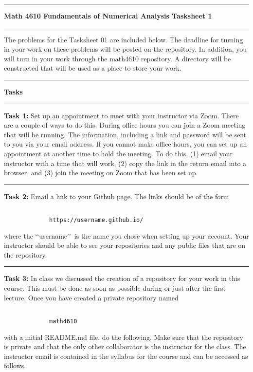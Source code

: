 \documentclass[10pt,fleqn]{article}
\begin{document}
\vskip0.1in\hrule\vskip0.1in \noindent
{\bf{\Large Math 4610 Fundamentals of Numerical Analysis Tasksheet 1 }}
\vskip0.1in\hrule\vskip0.1in \noindent
The problems for the Tasksheet 01 are included below. The deadline for turning
in your work on these problems will be posted on the repository. In addition,
you will turn in your work through the math4610 repository. A directory will be
constructed that will be used as a place to store your work.
\vskip0.1in\hrule\vskip0.1in \noindent
{\bf{\large Tasks}}
\vskip0.1in\hrule\vskip0.1in \noindent
\begin{trivlist}
  \item[\bf Task 1:] Set up an appointment to meet with your instructor via
        Zoom. There are a couple of ways to do this. During office hours you
        can join a Zoom meeting that will be running. The information, including
        a link and password will be sent to you via your email address. If you
        cannot make office hours, you can set up an appointment at another time
        to hold the meeting. To do this, (1) email your instructor with a time
        that will work, (2) copy the link in the return email into a browser,
        and (3) join the meeting on Zoom that has been set up.
\vskip0.1in\hrule\vskip0.1in \noindent
  \item[\bf Task 2:] Email a link to your Github page. The links should be of
        the form
        \begin{verbatim}

             https://username.github.io/

        \end{verbatim}
        where the \lq\lq username\rq\rq\ is the name you chose when setting up
        your account. Your instructor should be able to see your repositories 
        and any public files that are on the repository.
\vskip0.1in\hrule\vskip0.1in \noindent
  \item[\bf Task 3:] In class we discussed the creation of a repository for
        your work in this course. This must be done as soon as possible during
        or just after the first lecture. Once you have created a private
        repository named
        \begin{verbatim}

             math4610

        \end{verbatim}
        with a initial README.md file, do the following. Make sure that the
        repository is private and that the only other collaborator is the
        instructor for the class. The instructor email is contained in the
        syllabus for the course and can be accessed as follows.
        \begin{verbatim}


\end{verbatim}
\end{trivlist}
\end{document}
